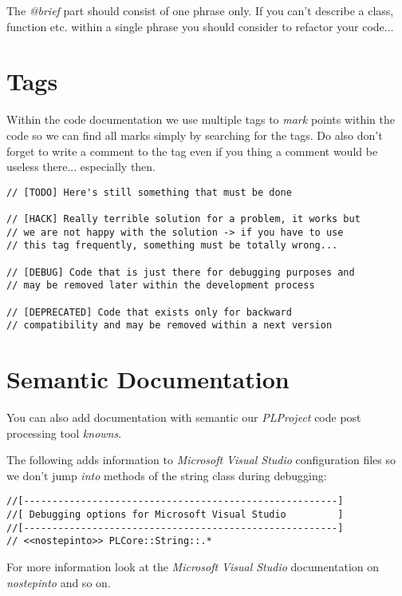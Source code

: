 The \emph{@brief} part should consist of one phrase only. If you can't describe a class, function etc. within a single phrase you should consider to refactor your code...




\section{Tags}
Within the code documentation we use multiple tags to \emph{mark} points within the code so we can find all marks simply by searching for the tags. Do also don't forget to write a comment to the tag even if you thing a comment would be useless there... especially then.

\begin{lstlisting}[caption=Comment tags]
// [TODO] Here's still something that must be done

// [HACK] Really terrible solution for a problem, it works but
// we are not happy with the solution -> if you have to use
// this tag frequently, something must be totally wrong...

// [DEBUG] Code that is just there for debugging purposes and
// may be removed later within the development process

// [DEPRECATED] Code that exists only for backward
// compatibility and may be removed within a next version
\end{lstlisting}




\section{Semantic Documentation}
You can also add documentation with semantic our \emph{PLProject} code post processing tool \emph{knowns}.

The following adds information to \emph{Microsoft Visual Studio} configuration files so we don't jump \emph{into} methods of the string class during debugging:

\begin{lstlisting}[caption=Semantic documentation]
//[-------------------------------------------------------]
//[ Debugging options for Microsoft Visual Studio         ]
//[-------------------------------------------------------]
// <<nostepinto>> PLCore::String::.*
\end{lstlisting}

For more information look at the \emph{Microsoft Visual Studio} documentation on \emph{nostepinto} and so on.
